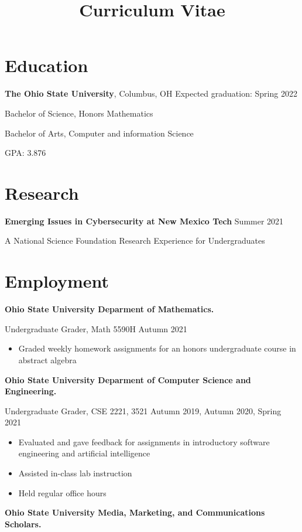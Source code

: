 \documentclass[10pt]{moderncv}
\title{Curriculum Vitae}
\begin{document}
\maketitle
\section*{Education}

\textbf{The Ohio State University}, Columbus, OH \hfill Expected graduation: Spring 2022

Bachelor of Science, Honors Mathematics

Bachelor of Arts, Computer and information Science

GPA: 3.876

\section*{Research}

\textbf{Emerging Issues in Cybersecurity at New Mexico Tech} \hfill Summer 2021

A National Science Foundation Research Experience for Undergraduates

\section*{Employment}

\textbf{Ohio State University Deparment of Mathematics.}

Undergraduate Grader, Math 5590H
\hfill Autumn 2021
\begin{itemize}
    \item Graded weekly homework assignments for an honors undergraduate course in abstract algebra
\end{itemize}

\textbf{Ohio State University Deparment of Computer Science and Engineering.}

Undergraduate Grader, CSE 2221, 3521
\hfill Autumn 2019, Autumn 2020, Spring 2021
\begin{itemize}
    \item Evaluated and gave feedback for assignments in introductory software engineering and artificial intelligence
    \item Assisted in-class lab instruction
    \item Held regular office hours
\end{itemize}

\textbf{Ohio State University Media, Marketing, and Communications Scholars.}
\end{document}
